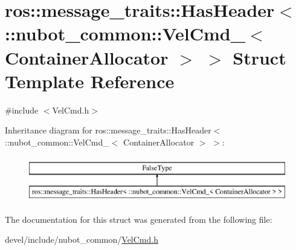 \hypertarget{structros_1_1message__traits_1_1HasHeader_3_01_1_1nubot__common_1_1VelCmd___3_01ContainerAllocator_01_4_01_4}{\section{ros\-:\-:message\-\_\-traits\-:\-:Has\-Header$<$ \-:\-:nubot\-\_\-common\-:\-:Vel\-Cmd\-\_\-$<$ Container\-Allocator $>$ $>$ Struct Template Reference}
\label{structros_1_1message__traits_1_1HasHeader_3_01_1_1nubot__common_1_1VelCmd___3_01ContainerAllocator_01_4_01_4}
}


{\ttfamily \#include $<$Vel\-Cmd.\-h$>$}

Inheritance diagram for ros\-:\-:message\-\_\-traits\-:\-:Has\-Header$<$ \-:\-:nubot\-\_\-common\-:\-:Vel\-Cmd\-\_\-$<$ Container\-Allocator $>$ $>$\-:\begin{figure}[H]
\begin{center}
\leavevmode
\includegraphics[height=2.000000cm]{structros_1_1message__traits_1_1HasHeader_3_01_1_1nubot__common_1_1VelCmd___3_01ContainerAllocator_01_4_01_4}
\end{center}
\end{figure}


The documentation for this struct was generated from the following file\-:\begin{DoxyCompactItemize}
\item 
devel/include/nubot\-\_\-common/\hyperlink{VelCmd_8h}{Vel\-Cmd.\-h}\end{DoxyCompactItemize}
